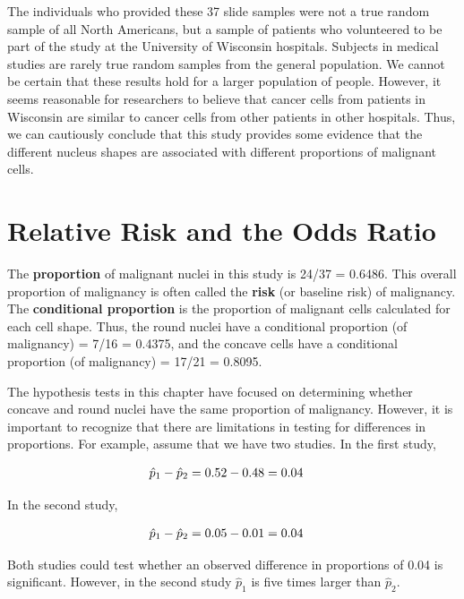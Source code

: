 \documentclass[
]{report}
\begin{document}
The individuals who provided these 37 slide samples were not a true random sample of all North Americans, but a sample of patients who volunteered to be part of the study at the University of Wisconsin hospitals. Subjects in medical studies are rarely true random samples from the general population. We cannot be certain that these results hold for a larger population of people. However, it seems reasonable for researchers to believe that cancer cells from patients in Wisconsin are similar to cancer cells from other patients in other hospitals. Thus, we can cautiously conclude that this study provides some evidence that the different nucleus shapes are associated with different proportions of malignant cells.

\hypertarget{relative-risk-and-the-odds-ratio}{%
\section{\texorpdfstring{\textbf{Relative Risk and the Odds Ratio}}{Relative Risk and the Odds Ratio}}\label{relative-risk-and-the-odds-ratio}}

The \textbf{proportion} of malignant nuclei in this study is 24/37 = 0.6486. This overall proportion of malignancy is often called the \textbf{risk} (or baseline risk) of malignancy. The \textbf{conditional proportion} is the proportion of malignant cells calculated for each cell shape. Thus, the round nuclei have a conditional proportion (of malignancy) = 7/16 = 0.4375, and the concave cells have a conditional proportion (of malignancy) = 17/21 = 0.8095.

The hypothesis tests in this chapter have focused on determining whether concave and round nuclei have the same proportion of malignancy. However, it is important to recognize that there are limitations in testing for differences in proportions. For example, assume that we have two studies. In the first study,

\begin{align}
\hat p_1 - \hat p_2 &= 0.52 - 0.48 = 0.04
\notag
\end{align}

In the second study,

\begin{align}
\hat p_1 - \hat p_2 &= 0.05 - 0.01 = 0.04 
\notag
\end{align}

Both studies could test whether an observed difference in proportions of 0.04 is significant. However, in the second study \emph{\(\hat p_1\)} is five times larger than \emph{\(\hat p_2\)}.
\end{document}
